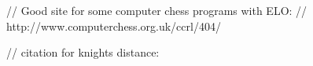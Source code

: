 \documentclass[numbers]{sigplanconf}
\begin{document}


// Good site for some computer chess programs with ELO:
// http://www.computerchess.org.uk/ccrl/404/


\nocite{elo1978rating}
\nocite{topple}
// citation for knights distance:
\nocite{miller2013counting}

{}

\end{document}
